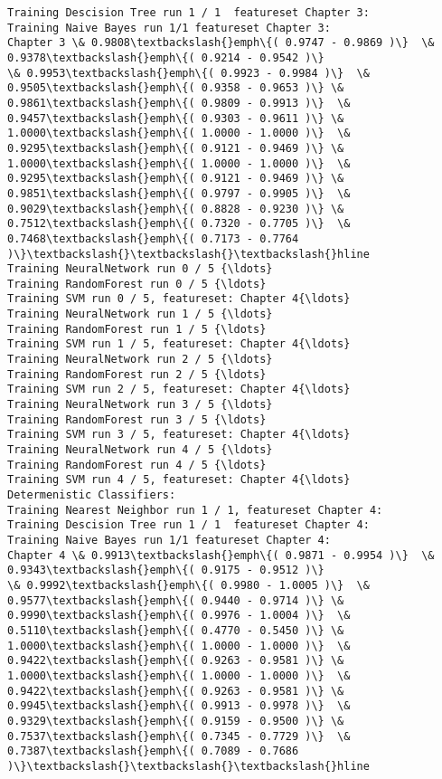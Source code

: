 \documentclass[11pt]{article}
\begin{document}
\begin{Verbatim}[commandchars=\\\{\}]
Training Descision Tree run 1 / 1  featureset Chapter 3:
Training Naive Bayes run 1/1 featureset Chapter 3:
Chapter 3 \& 0.9808\textbackslash{}emph\{( 0.9747 - 0.9869 )\}  \& 0.9378\textbackslash{}emph\{( 0.9214 - 0.9542 )\}
\& 0.9953\textbackslash{}emph\{( 0.9923 - 0.9984 )\}  \& 0.9505\textbackslash{}emph\{( 0.9358 - 0.9653 )\} \&
0.9861\textbackslash{}emph\{( 0.9809 - 0.9913 )\}  \& 0.9457\textbackslash{}emph\{( 0.9303 - 0.9611 )\} \&
1.0000\textbackslash{}emph\{( 1.0000 - 1.0000 )\}  \& 0.9295\textbackslash{}emph\{( 0.9121 - 0.9469 )\} \&
1.0000\textbackslash{}emph\{( 1.0000 - 1.0000 )\}  \& 0.9295\textbackslash{}emph\{( 0.9121 - 0.9469 )\} \&
0.9851\textbackslash{}emph\{( 0.9797 - 0.9905 )\}  \& 0.9029\textbackslash{}emph\{( 0.8828 - 0.9230 )\} \&
0.7512\textbackslash{}emph\{( 0.7320 - 0.7705 )\}  \& 0.7468\textbackslash{}emph\{( 0.7173 - 0.7764 )\}\textbackslash{}\textbackslash{}\textbackslash{}hline
Training NeuralNetwork run 0 / 5 {\ldots}
Training RandomForest run 0 / 5 {\ldots}
Training SVM run 0 / 5, featureset: Chapter 4{\ldots}
Training NeuralNetwork run 1 / 5 {\ldots}
Training RandomForest run 1 / 5 {\ldots}
Training SVM run 1 / 5, featureset: Chapter 4{\ldots}
Training NeuralNetwork run 2 / 5 {\ldots}
Training RandomForest run 2 / 5 {\ldots}
Training SVM run 2 / 5, featureset: Chapter 4{\ldots}
Training NeuralNetwork run 3 / 5 {\ldots}
Training RandomForest run 3 / 5 {\ldots}
Training SVM run 3 / 5, featureset: Chapter 4{\ldots}
Training NeuralNetwork run 4 / 5 {\ldots}
Training RandomForest run 4 / 5 {\ldots}
Training SVM run 4 / 5, featureset: Chapter 4{\ldots}
Determenistic Classifiers:
Training Nearest Neighbor run 1 / 1, featureset Chapter 4:
Training Descision Tree run 1 / 1  featureset Chapter 4:
Training Naive Bayes run 1/1 featureset Chapter 4:
Chapter 4 \& 0.9913\textbackslash{}emph\{( 0.9871 - 0.9954 )\}  \& 0.9343\textbackslash{}emph\{( 0.9175 - 0.9512 )\}
\& 0.9992\textbackslash{}emph\{( 0.9980 - 1.0005 )\}  \& 0.9577\textbackslash{}emph\{( 0.9440 - 0.9714 )\} \&
0.9990\textbackslash{}emph\{( 0.9976 - 1.0004 )\}  \& 0.5110\textbackslash{}emph\{( 0.4770 - 0.5450 )\} \&
1.0000\textbackslash{}emph\{( 1.0000 - 1.0000 )\}  \& 0.9422\textbackslash{}emph\{( 0.9263 - 0.9581 )\} \&
1.0000\textbackslash{}emph\{( 1.0000 - 1.0000 )\}  \& 0.9422\textbackslash{}emph\{( 0.9263 - 0.9581 )\} \&
0.9945\textbackslash{}emph\{( 0.9913 - 0.9978 )\}  \& 0.9329\textbackslash{}emph\{( 0.9159 - 0.9500 )\} \&
0.7537\textbackslash{}emph\{( 0.7345 - 0.7729 )\}  \& 0.7387\textbackslash{}emph\{( 0.7089 - 0.7686 )\}\textbackslash{}\textbackslash{}\textbackslash{}hline

\end{Verbatim}
\end{document}
